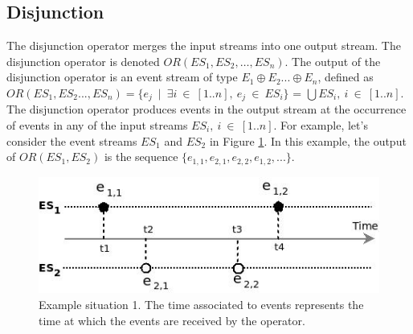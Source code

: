  \subsection{Disjunction}
 The disjunction operator merges the input streams into one output stream. The disjunction operator is denoted $OR(ES_1, ES_2, …, ES_n)$. 
 The output of the disjunction operator is an event stream of type $E_1\oplus E_2 ...\oplus E_n$, defined as
 $OR(ES_1, ES_2 ..., ES_n) = \{e_j\ \mid\ \exists i\ \in\ [1..n],\ e_j\ \in\ ES_i\}$ = $\bigcup ES_i,\ i\ \in\ [1..n]$.
 The disjunction operator produces events in the output stream at the occurrence of events in any of the input streams $ES_i,\ i\ \in\ [1..n]$. 
For example, let's consider the event streams $ES_1$ and $ES_2$ in Figure \ref{fig:op_or_exple}.
In this example, the output of $OR(ES_1, ES_2)$ is the sequence $\{e_{1,1}, e_{2,1}, e_{2,2}, e_{1,2}, ...\}$.
\begin{figure}[h]
  \begin{center}
    \includegraphics[scale=0.65]{chap3/images/orExample.jpeg}
  \end{center}
  \caption{Example situation 1. The time associated to events represents the time at which the events are received by the operator.}
  \label{fig:op_or_exple}
\end{figure}

